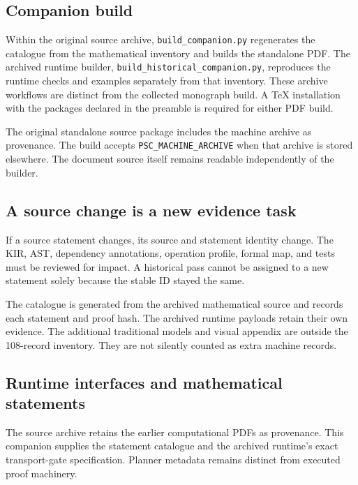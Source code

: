 \documentclass[a4paper,11pt]{article}
\begin{document}
\subsection{Companion build}
Within the original source archive, \nolinkurl{build_companion.py} regenerates the catalogue from the mathematical inventory and builds the standalone PDF. The archived runtime builder, \nolinkurl{build_historical_companion.py}, reproduces the runtime checks and examples separately from that inventory. These archive workflows are distinct from the collected monograph build. A TeX installation with the packages declared in the preamble is required for either PDF build.

The original standalone source package includes the machine archive as provenance. The build accepts \nolinkurl{PSC_MACHINE_ARCHIVE} when that archive is stored elsewhere. The document source itself remains readable independently of the builder.
\subsection{A source change is a new evidence task}
If a source statement changes, its source and statement identity change. The KIR, AST, dependency annotations, operation profile, formal map, and tests must be reviewed for impact. A historical pass cannot be assigned to a new statement solely because the stable ID stayed the same.

The catalogue is generated from the archived mathematical source and records each statement and proof hash. The archived runtime payloads retain their own evidence. The additional traditional models and visual appendix are outside the 108-record inventory. They are not silently counted as extra machine records.
\subsection{Runtime interfaces and mathematical statements}
The source archive retains the earlier computational PDFs as provenance. This companion supplies the statement catalogue and the archived runtime's exact transport-gate specification. Planner metadata remains distinct from executed proof machinery.
\end{document}
